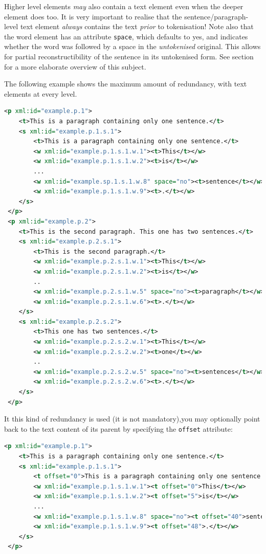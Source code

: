 \documentclass[a4paper,12pt]{report}
\begin{document}
Higher level elements \emph{may} also contain a text element even when the deeper element does too. It is very important to realise that the sentence/paragraph-level text element \emph{always} contains the text \emph{prior} to tokenisation! Note also that the word element has an attribute \texttt{space}, which defaults to yes, and indicates whether the word was followed by a space in the \emph{untokenised} original. This allows for partial reconstructibility of the sentence in its untokenised form. See section~\label{sec:textcontent} for a more elaborate overview of this subject.

The following example shows the maximum amount of redundancy, with text elements at every level.

\begin{lstlisting}[language=xml]
 <p xml:id="example.p.1">
    <t>This is a paragraph containing only one sentence.</t>
    <s xml:id="example.p.1.s.1">        
        <t>This is a paragraph containing only one sentence.</t>
        <w xml:id="example.p.1.s.1.w.1"><t>This</t></w>
        <w xml:id="example.p.1.s.1.w.2"><t>is</t></w>
        ...
        <w xml:id="example.sp.1.s.1.w.8" space="no"><t>sentence</t></w>
        <w xml:id="example.p.1.s.1.w.9"><t>.</t></w>
    </s>
 </p>
 <p xml:id="example.p.2">
    <t>This is the second paragraph. This one has two sentences.</t>
    <s xml:id="example.p.2.s.1">
        <t>This is the second paragraph.</t>
        <w xml:id="example.p.2.s.1.w.1"><t>This</t></w>
        <w xml:id="example.p.2.s.1.w.2"><t>is</t></w>    
        ..
        <w xml:id="example.p.2.s.1.w.5" space="no"><t>paragraph</t></w>    
        <w xml:id="example.p.2.s.1.w.6"><t>.</t></w>    
    </s>
    <s xml:id="example.p.2.s.2">
        <t>This one has two sentences.</t>
        <w xml:id="example.p.2.s.2.w.1"><t>This</t></w>
        <w xml:id="example.p.2.s.2.w.2"><t>one</t></w>    
        ..
        <w xml:id="example.p.2.s.2.w.5" space="no"><t>sentences</t></w>    
        <w xml:id="example.p.2.s.2.w.6"><t>.</t></w>    
    </s>
 </p>
\end{lstlisting}

It this kind of redundancy is used (it is not mandatory),you may optionally point back to the text content of its parent by specifying the \texttt{offset} attribute:

\begin{lstlisting}[language=xml]
 <p xml:id="example.p.1">
    <t>This is a paragraph containing only one sentence.</t>
    <s xml:id="example.p.1.s.1">        
        <t offset="0">This is a paragraph containing only one sentence.</t>
        <w xml:id="example.p.1.s.1.w.1"><t offset="0">This</t></w>
        <w xml:id="example.p.1.s.1.w.2"><t offset="5">is</t></w>
        ...
        <w xml:id="example.p.1.s.1.w.8" space="no"><t offset="40">sentence</t></w>
        <w xml:id="example.p.1.s.1.w.9"><t offset="48">.</t></w>
    </s>
 </p>
\end{lstlisting}
\end{document}
